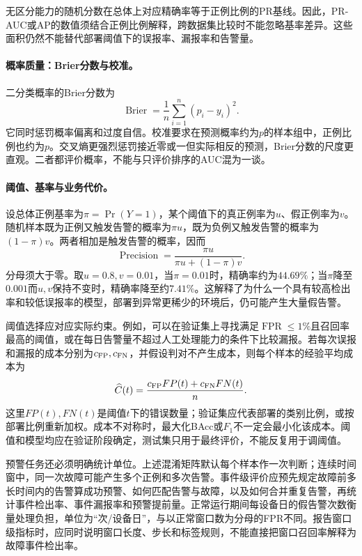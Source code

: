 无区分能力的随机分数在总体上对应精确率等于正例比例的PR基线。因此，PR-AUC或AP的数值须结合正例比例解释，跨数据集比较时不能忽略基率差异。这些面积仍然不能替代部署阈值下的误报率、漏报率和告警量。

\paragraph{概率质量：Brier分数与校准。}
二分类概率的Brier分数为
\begin{equation}
 \operatorname{Brier}=\frac1n\sum_{i=1}^n(p_i-y_i)^2.
 \label{eq:classification-brier}
\end{equation}
它同时惩罚概率偏离和过度自信。校准要求在预测概率约为$p$的样本组中，正例比例也约为$p$。交叉熵更强烈惩罚接近零或一但实际相反的预测，Brier分数的尺度更直观。二者都评价概率，不能与只评价排序的AUC混为一谈。

\paragraph{阈值、基率与业务代价。}
设总体正例基率为$\pi=\Pr(Y=1)$，某个阈值下的真正例率为$u$、假正例率为$v$。随机样本既为正例又触发告警的概率为$\pi u$，既为负例又触发告警的概率为$(1-\pi)v$。两者相加是触发告警的概率，因而
\begin{equation}
 \operatorname{Precision}=\frac{\pi u}{\pi u+(1-\pi)v}.
 \label{eq:classification-prevalence}
\end{equation}
分母须大于零。取$u=0.8,v=0.01$，当$\pi=0.01$时，精确率约为$44.69\%$；当$\pi$降至$0.001$而$u,v$保持不变时，精确率降至约$7.41\%$。这解释了为什么一个具有较高检出率和较低误报率的模型，部署到异常更稀少的环境后，仍可能产生大量假告警。

阈值选择应对应实际约束。例如，可以在验证集上寻找满足$\operatorname{FPR}\leq1\%$且召回率最高的阈值，或在每日告警量不超过人工处理能力的条件下比较漏报。若每次误报和漏报的成本分别为$c_{\rm FP},c_{\rm FN}$，并假设判对不产生成本，则每个样本的经验平均成本为
\begin{equation}
 \widehat C(t)=\frac{c_{\rm FP}FP(t)+c_{\rm FN}FN(t)}n.
 \label{eq:classification-alarm-cost}
\end{equation}
这里$FP(t),FN(t)$是阈值$t$下的错误数量；验证集应代表部署的类别比例，或按部署比例重新加权。成本不对称时，最大化BAcc或$F_1$不一定会最小化该成本。阈值和模型均应在验证阶段确定，测试集只用于最终评价，不能反复用于调阈值。

预警任务还必须明确统计单位。上述混淆矩阵默认每个样本作一次判断；连续时间窗中，同一次故障可能产生多个正例和多次告警。事件级评价应预先规定故障前多长时间内的告警算成功预警、如何匹配告警与故障，以及如何合并重复告警，再统计事件检出率、事件漏报率和预警提前量。正常运行期间每设备日的假告警次数衡量处理负担，单位为“次/设备日”，与以正常窗口数为分母的FPR不同。报告窗口级指标时，应同时说明窗口长度、步长和标签规则，不能直接把窗口召回率解释为故障事件检出率。

